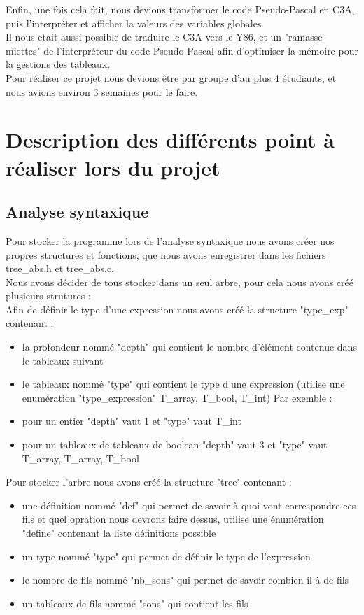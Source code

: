 \documentclass{report}
\begin{document}
Enfin, une fois cela fait, nous devions transformer le code Pseudo-Pascal en C3A, puis l'interpréter et afficher la valeurs des variables globales.\\

Il nous etait aussi possible de traduire le C3A vers le Y86, et un "ramasse-miettes" de l'interpréteur du code Pseudo-Pascal afin d'optimiser la mémoire pour la gestions des tableaux.\\

Pour réaliser ce projet nous devions être par groupe d'au plus 4 étudiants, et nous avions environ 3 semaines pour le faire.

\newpage

\section{Description des différents point à réaliser lors du projet}
\subsection{Analyse syntaxique}
Pour stocker la programme lors de l'analyse syntaxique nous avons créer nos propres structures et fonctions, que nous avons enregistrer dans les fichiers tree\_abs.h et tree\_abs.c.\\

Nous avons décider de tous stocker dans un seul arbre, pour cela nous avons créé plusieurs strutures :\\

Afin de définir le type d'une expression nous avons créé la structure "type\_exp" contenant :
\begin{itemize}
\item la profondeur nommé "depth" qui contient le nombre d'élément contenue dans le tableaux suivant
\item le tableaux nommé "type" qui contient le type d'une expression (utilise une enumération "type\_expression" {T\_array, T\_bool, T\_int})
Par exemble :
\item pour un entier "depth" vaut 1 et "type" vaut {T\_int}
\item pour un tableaux de tableaux de boolean "depth" vaut 3 et "type" vaut {T\_array, T\_array, T\_bool}
\end{itemize}
\bigskip

Pour stocker l'arbre nous avons créé la structure "tree" contenant :
\begin{itemize}
\item une définition nommé "def" qui permet de savoir à quoi vont correspondre ces fils et quel opration nous devrons faire dessus, utilise une énumération "define" contenant la liste définitions possible
\item un type nommé "type" qui permet de définir le type de l'expression
\item le nombre de fils nommé "nb\_sons" qui permet de savoir combien il à de fils
\item un tableaux de fils nommé "sons" qui contient les fils
\end{itemize}
\bigskip
\end{document}
